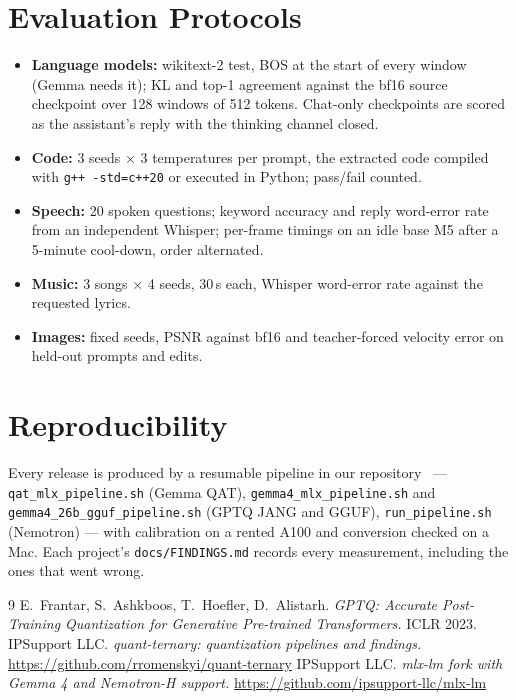 \documentclass[10pt,letterpaper]{article}
\begin{document}
\section{Evaluation Protocols}

\begin{itemize}
  \item \textbf{Language models:} wikitext-2 test, BOS at the start of every window (Gemma needs it); KL and top-1 agreement against the bf16 source checkpoint over 128 windows of 512 tokens. Chat-only checkpoints are scored as the assistant's reply with the thinking channel closed.
  \item \textbf{Code:} 3 seeds × 3 temperatures per prompt, the extracted code compiled with \texttt{g++ -std=c++20} or executed in Python; pass/fail counted.
  \item \textbf{Speech:} 20 spoken questions; keyword accuracy and reply word-error rate from an independent Whisper; per-frame timings on an idle base M5 after a 5-minute cool-down, order alternated.
  \item \textbf{Music:} 3 songs × 4 seeds, 30\,s each, Whisper word-error rate against the requested lyrics.
  \item \textbf{Images:} fixed seeds, PSNR against bf16 and teacher-forced velocity error on held-out prompts and edits.
\end{itemize}

\clearpage
\section{Reproducibility}

{\raggedright
Every release is produced by a resumable pipeline in our repository~\cite{repo} --- \texttt{qat\_mlx\_pipeline.sh} (Gemma QAT), \texttt{gemma4\_mlx\_pipeline.sh} and \texttt{gemma4\_26b\_gguf\_pipeline.sh} (GPTQ JANG and GGUF), \texttt{run\_pipeline.sh} (Nemotron) --- with calibration on a rented A100 and conversion checked on a Mac. Each project's \texttt{docs/FINDINGS.md} records every measurement, including the ones that went wrong.\par}

{\raggedright
\begin{thebibliography}{9}
 E.~Frantar, S.~Ashkboos, T.~Hoefler, D.~Alistarh. \emph{GPTQ: Accurate Post-Training Quantization for Generative Pre-trained Transformers.} ICLR 2023.
 IPSupport LLC. \emph{quant-ternary: quantization pipelines and findings.} \url{https://github.com/rromenskyi/quant-ternary}
 IPSupport LLC. \emph{mlx-lm fork with Gemma 4 and Nemotron-H support.} \url{https://github.com/ipsupport-llc/mlx-lm}
\end{thebibliography}
}
\end{document}
